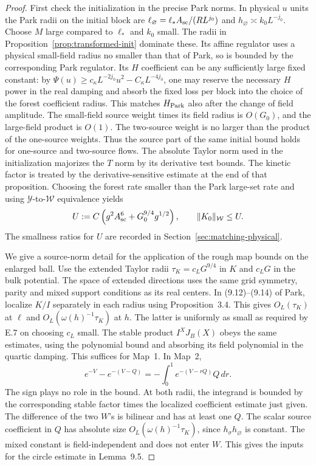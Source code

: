 \documentclass[11pt]{article}
\begin{document}
\begin{proof}
First check the initialization in the precise Park norms.
In physical \(u\) units the Park radii on the initial block
are
\(\ell_\varnothing=\ell_*A_{\rm sc}/(R L^{j_0})\)
and \(h_\varnothing\asymp k_0L^{-j_0}\).
Choose \(M\) large compared to \(\ell_*\) and \(k_0\) small.
The radii in Proposition~\ref{prop:transformed-init}
dominate these. Its affine regulator uses a physical
small-field radius no smaller than that of Park, so is
bounded by the corresponding Park regulator. Its
\(H\) coefficient can be any sufficiently large fixed
constant: by
\(\Psi(u)\ge c_\kappa L^{-2j_0}u^2-C_\kappa L^{-4j_0}\),
one may reserve the necessary \(H\) power in the real
damping and absorb the fixed loss per block into the
choice of the forest coefficient radius. This matches
\(H_{\rm Park}\) also after the change of field amplitude.
The small-field source weight times its field radius is
\(O(G_0)\), and the large-field product is \(O(1)\).
The two-source weight is no larger than the product
of the one-source weights. Thus the source part of the
same initial bound holds for one-source and two-source
flows. The absolute Taylor norm used in the initialization
majorizes the \(T\) norm by its derivative test bounds.
The kinetic factor is treated by the derivative-sensitive
estimate at the end of that proposition. Choosing the
forest rate smaller than the Park large-set rate and
using \(\mathcal Y\)-to-\(\mathcal W\) equivalence yields
\[
 U:=C\left(g^2A_{\rm sc}^6+G_0^{9/4}g^{1/2}\right),
 \qquad \|K_0\|_{\mathcal W}\le U .
\]
The smallness ratios for \(U\) are recorded in
Section~\ref{sec:matching-physical}.

We give a source-norm detail for the application of the
rough map bounds on the enlarged ball. Use the extended
Taylor radii \(\tau_K=c_LG^{9/4}\) in \(K\) and \(c_LG\)
in the bulk potential. The space of extended directions
uses the same grid symmetry, parity and mixed support
conditions as its real centers. In (9.12)--(9.14) of Park,
localize \(K/I\) separately in each radius using
Proposition~3.4. This gives \(O_L(\tau_K)\) at \(\ell\)
and \(O_L(\omega(h)^{-1}\tau_K)\) at \(h\). The latter
is uniformly as small as required by E.7 on choosing
\(c_L\) small. The stable product \(I^X J_B(X)\)
obeys the same estimates, using the polynomial bound and
absorbing its field polynomial in the quartic damping.
This suffices for Map~1. In Map~2,
\[
 e^{-V}-e^{-(V-Q)}=-\int_0^1 e^{-(V-rQ)}Q\,dr .
\]
The sign plays no role in the bound. At both radii,
the integrand is bounded by the corresponding stable
factor times the localized coefficient estimate just given.
The difference of the two \(W\)'s is bilinear and has
at least one \(Q\). The scalar source coefficient in
\(Q\) has absolute size \(O_L(\omega(h)^{-1}\tau_K)\),
since \(h_\sigma h_\varnothing\) is constant. The
mixed constant is field-independent and does not enter
\(W\). This gives the inputs for the circle estimate
in Lemma~9.5.


\end{proof}
\end{document}
